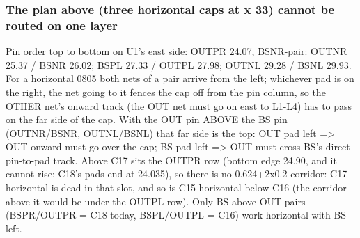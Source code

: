 \documentclass[11pt]{article}
\begin{document}
\subsubsection*{The plan above (three horizontal caps at x 33) cannot be routed on one layer}
Pin order top to bottom on U1's east side: OUTPR 24.07, BSNR-pair: OUTNR 25.37 / BSNR 26.02; BSPL 27.33 / OUTPL 27.98; OUTNL 29.28 / BSNL 29.93. For a horizontal 0805 both nets of a pair arrive from the left; whichever pad is on the right, the net going to it fences the cap off from the pin column, so the OTHER net's onward track (the OUT net must go on east to L1-L4) has to pass on the far side of the cap. With the OUT pin ABOVE the BS pin (OUTNR/BSNR, OUTNL/BSNL) that far side is the top: OUT pad left =\textgreater{} OUT onward must go over the cap; BS pad left =\textgreater{} OUT must cross BS's direct pin-to-pad track. Above C17 sits the OUTPR row (bottom edge 24.90, and it cannot rise: C18's pads end at 24.035), so there is no 0.624+2x0.2 corridor: C17 horizontal is dead in that slot, and so is C15 horizontal below C16 (the corridor above it would be under the OUTPL row). Only BS-above-OUT pairs (BSPR/OUTPR = C18 today, BSPL/OUTPL = C16) work horizontal with BS left.
\end{document}
